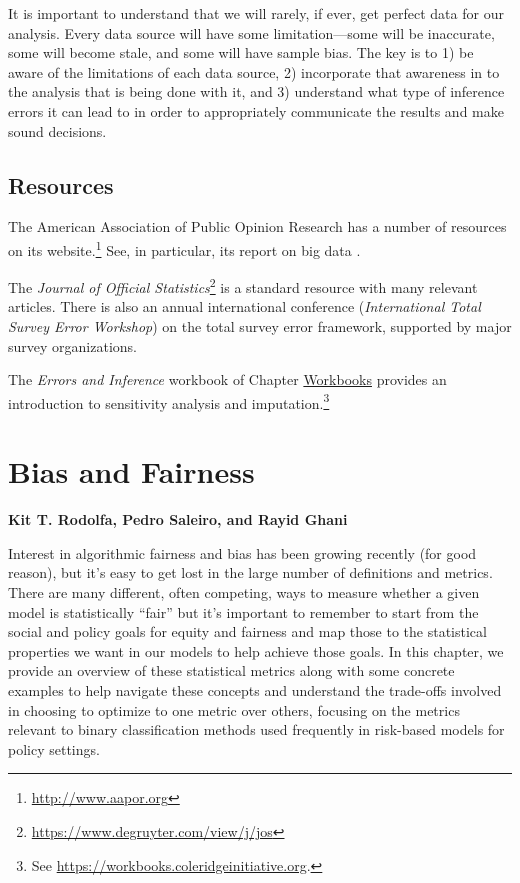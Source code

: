\documentclass[]{krantz}
\begin{document}
It is important to understand that we will rarely, if ever, get perfect
data for our analysis. Every data source will have some
limitation---some will be inaccurate, some will become stale, and some
will have sample bias. The key is to 1) be aware of the limitations of
each data source, 2) incorporate that awareness in to the analysis that
is being done with it, and 3) understand what type of inference errors
it can lead to in order to appropriately communicate the results and
make sound decisions.

\section{Resources}\label{resources-5}

The American Association of Public Opinion Research has a number of
resources on its website.\footnote{\url{http://www.aapor.org}} See, in
particular, its report on big data \citep{japec2015big}.

The \emph{Journal of Official Statistics}\footnote{\url{https://www.degruyter.com/view/j/jos}}
is a standard resource with many relevant articles. There is also an
annual international conference (\emph{International Total Survey Error
Workshop}) on the total survey error framework, supported by major
survey organizations.

The \emph{Errors and Inference} workbook of Chapter
\protect\hyperlink{chap:workbooks}{Workbooks} provides an introduction
to sensitivity analysis and imputation.\footnote{See
  \url{https://workbooks.coleridgeinitiative.org}.}

\hypertarget{chap:bias}{\chapter{Bias and Fairness}\label{chap:bias}}

\textbf{Kit T. Rodolfa, Pedro Saleiro, and Rayid Ghani}

Interest in algorithmic fairness and bias has been growing recently (for
good reason), but it's easy to get lost in the large number of
definitions and metrics. There are many different, often competing, ways
to measure whether a given model is statistically ``fair'' but it's
important to remember to start from the social and policy goals for
equity and fairness and map those to the statistical properties we want
in our models to help achieve those goals. In this chapter, we provide
an overview of these statistical metrics along with some concrete
examples to help navigate these concepts and understand the trade-offs
involved in choosing to optimize to one metric over others, focusing on
the metrics relevant to binary classification methods used frequently in
risk-based models for policy settings.
\end{document}

